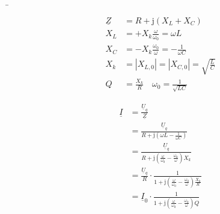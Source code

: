 \b{%
\begin{frame}%
\begin{minipage}{0.3\textwidth}%
    \begin{align*}
        \underline{Z} &= R + \mathrm{j}(X_L + X_C) \\
        X_L &= +X_k \frac{\omega}{\omega_0} = \omega L \\
        X_C &= -X_k \frac{\omega_0}{\omega} = -\frac{1}{\omega C}\\
        X_k &= |X_{L,0}| = |X_{C,0}| = \sqrt{\frac{L}{C}}\\
        Q &= \frac{X_k}{R} \quad \omega_0 = \frac{1}{\sqrt{LC}}
    \end{align*}
\end{minipage}\hfill%
\begin{minipage}{0.65\textwidth}\centering
    \begin{align*}
        \underline{I} &= \frac{\underline{U}_q}{\underline{Z}} \\
        &= \frac{\underline{U}_q}{R + \mathrm{j}\left(\omega L - \frac{1}{\omega C}\right)} \\
        &= \frac{\underline{U}_q}{R + \mathrm{j}\left(\frac{\omega}{\omega_0} - \frac{\omega_0}{\omega}\right)X_k} \\
        &= \frac{\underline{U}_q}{R} \cdot \frac{1}{1 + \mathrm{j}\left(\frac{\omega}{\omega_0} - \frac{\omega_0}{\omega}\right)\frac{X_k}{R}} \\
        &= \underline{I}_0 \cdot \frac{1}{1 + \mathrm{j}\left(\frac{\omega}{\omega_0} - \frac{\omega_0}{\omega}\right)Q}
    \end{align*}
\end{minipage}
\end{frame}
}

